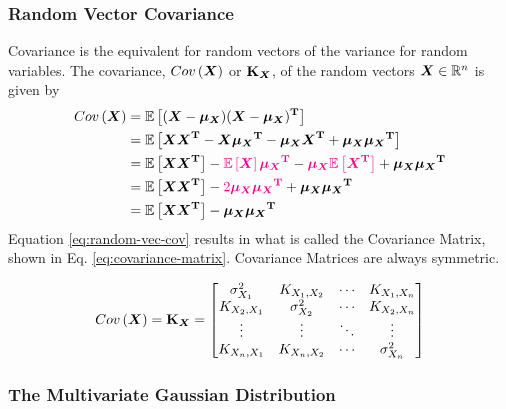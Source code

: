 \documentclass[12pt]{article}
\begin{document}
\subsubsection{Random Vector Covariance}
Covariance is the equivalent for random vectors of the variance for random variables. The covariance, $\mathop{Cov}\left({\boldsymbol{X}}\right)$ or $\boldsymbol{\mathbf{K}}_{{\boldsymbol{X}}}$, of the random vectors ${\boldsymbol{X}} \in \mathbb{R}^n$ is given by
\begin{equation}
    \begin{aligned}
        \mathop{Cov}\left({\boldsymbol{X}}\right) &= \mathbb{E}\left[({\boldsymbol{X}} - {\boldsymbol{\mu_X}}) ({\boldsymbol{X}} - {\boldsymbol{\mu_X}})^\mathbf{T}\right] \\
        &= \mathbb{E}\left[{\boldsymbol{X}}{\boldsymbol{X}}^\mathbf{T} - {\boldsymbol{X}}{\boldsymbol{\mu_X}}^\mathbf{T} - {\boldsymbol{\mu_X}}{\boldsymbol{X}}^{\mathbf{T}} + {\boldsymbol{\mu_X}} {\boldsymbol{\mu_X}}^\mathbf{T}\right] \\
        &= \mathbb{E}\left[{\boldsymbol{X}}{\boldsymbol{X}}^\mathbf{T}\right] - \color{magenta}\mathbb{E}\left[{\boldsymbol{X}}\right]{\boldsymbol{\mu_X}}^\mathbf{T}\color{black} - \color{magenta}{\boldsymbol{\mu_X}}\mathbb{E}\left[{\boldsymbol{X}}^{\mathbf{T}}\right]\color{black} + {\boldsymbol{\mu_X}} {\boldsymbol{\mu_X}}^\mathbf{T}\\
        &= \mathbb{E}\left[{\boldsymbol{X}}{\boldsymbol{X}}^\mathbf{T}\right] - \color{magenta}2 {\boldsymbol{\mu_X}} {\boldsymbol{\mu_X}}^\mathbf{T}\color{black} + {\boldsymbol{\mu_X}} {\boldsymbol{\mu_X}}^\mathbf{T}\\
        &= \mathbb{E}\left[{\boldsymbol{X}}{\boldsymbol{X}}^\mathbf{T}\right] - {\boldsymbol{\mu_X}} {\boldsymbol{\mu_X}}^\mathbf{T}
    \end{aligned}
    \label{eq:random-vec-cov}
\end{equation}
Equation \ref{eq:random-vec-cov} results in what is called the Covariance Matrix, shown in Eq. \ref{eq:covariance-matrix}. Covariance Matrices are always symmetric.

\begin{equation}
    \mathop{Cov}\left({\boldsymbol{X}}\right) = \boldsymbol{\mathbf{K}}_{{\boldsymbol{X}}} = \begin{bmatrix}
        \sigma^2_{X_1} & K_{X_1, X_2} & \cdots & K_{X_1, X_n} \\
        K_{X_2, X_1} & \sigma^2_{X_2} & \cdots & K_{X_2, X_n} \\
        \vdots & \vdots & \ddots & \vdots \\
        K_{X_n, X_1} & K_{X_n, X_2} & \cdots & \sigma_{X_n}^2
    \end{bmatrix}
    \label{eq:covariance-matrix}
\end{equation}

\subsubsection{The Multivariate Gaussian Distribution}
\end{document}
